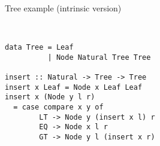 \documentclass[aspectratio=169]{beamer}
\begin{document}
\begin{frame}[fragile]{Tree example (intrinsic version)}
\begin{minipage}{.6\textwidth}
\begin{code}
\AgdaSpace{}%
\AgdaSpace{}%
\AgdaSymbol{(}\AgdaSpace{}%
\AgdaSpace{}%
\AgdaSpace{}%
\AgdaSpace{}%
\AgdaSymbol{)}\<%
\\
\>[0]\AgdaSymbol{\{-\#}\AgdaSpace{}%
\AgdaSpace{}%
\AgdaSpace{}%
\AgdaSpace{}%
\AgdaSymbol{\#-\}}\<%
\end{code}
\end{minipage}\hspace{-1cm}\vrule\hspace{.25cm}
\begin{minipage}{.4\textwidth}%
\begin{verbatim}
data Tree = Leaf
          | Node Natural Tree Tree

insert :: Natural -> Tree -> Tree
insert x Leaf = Node x Leaf Leaf
insert x (Node y l r)
  = case compare x y of
        LT -> Node y (insert x l) r
        EQ -> Node x l r
        GT -> Node y l (insert x r)
\end{verbatim}
\end{minipage}

\end{frame}
\end{document}
